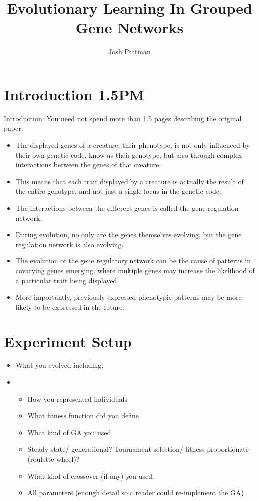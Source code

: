 \documentclass[twocolumn,a4paper]{article}
\author{Josh Pattman}
\title{Evolutionary Learning In Grouped Gene Networks}
\begin{document}
	\maketitle
    \section{Introduction 1.5PM}
    Introduction: You need not spend more than 1.5 pages describing the original paper.
    \begin{itemize}
        \item The displayed genes of a creature, their phenotype, is not only influenced by their own genetic code, know as their genotype, but also through complex interactions between the genes of that creature.
        \item This means that each trait displayed by a creature is actually the result of the entire genotype, and not just a single locus in the genetic code.
        \item The interactions between the different genes is called the gene regulation network.
        \item During evolution, no only are the genes themselves evolving, but the gene regulation network is also evolving.
        \item The evolution of the gene regulatory network can be the cause of patterns in covarying genes emerging, where multiple genes may increase the likelihood of a particular trait being displayed.
        \item More importantly, previously expressed phenotypic patterns may be more likely to be expressed in the future.
    \end{itemize}

    \section{Experiment Setup}
    \begin{itemize}
        \item What you evolved including:
        \item \begin{itemize}
            \item How you represented individuals
            \item What fitness function did you define
            \item What kind of GA you used
            \item Steady state/ generational?  Tournament selection/ fitness proportionate (roulette wheel)?
            \item What kind of crossover (if any) you used.
            \item All parameters (enough detail so a reader could re-implement the GA)
        \end{itemize}
    \end{itemize}
\end{document}

